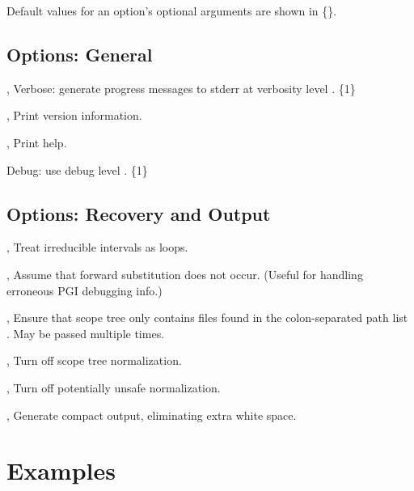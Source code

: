 \documentclass[english]{article}
\begin{document}
Default values for an option's optional arguments are shown in \{\}.

\subsection{Options: General}

\begin{Description}
\item[\OptoArg{-v}{n}, \OptoArg{--verbose}{n}] Verbose: generate progress messages to stderr at verbosity level .  \{1\}
\item[\Opt{-V}, \Opt{--version}] Print version information.
\item[\Opt{-h}, \Opt{--help}] Print help.
\item[\OptoArg{--debug}{n}]   Debug: use debug level . \{1\}
\end{Description}

\subsection{Options: Recovery and Output}

\begin{Description}
  \item[\Opt{-i}, \Opt{--irreducible-interval-as-loop}] Treat irreducible intervals as loops.
  \item[\Opt{-f}, \Opt{--forward-substitution-off}] Assume that forward substitution does not occur.  (Useful for handling erroneous PGI debugging info.)

  \item[\OptArg{-p}{path-list}, \OptArg{--canonical-paths}{path-list}] Ensure that scope tree only contains files found in the colon-separated path list . May be passed multiple times.

\item[\Opt{-n}, \Opt{--normalize-off}] Turn off scope tree normalization.
\item[\Opt{-u}, \Opt{--unsafe-normalize-off}] Turn off potentially unsafe normalization.

\item[\Opt{-c}, \Opt{--compact}] Generate compact output, eliminating extra white space.
\end{Description}

\section{Examples}
\end{document}
